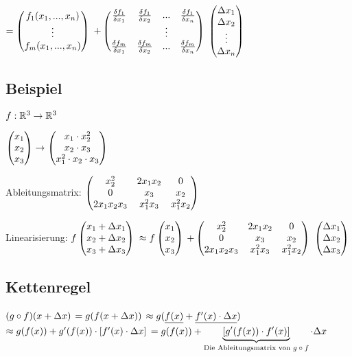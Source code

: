 $=  \begin{pmatrix} f_1(x_1,...,x_n)\\\vdots\\f_m(x_1,...,x_n) \end{pmatrix}  $
$+  \begin{pmatrix} \frac{\delta f_1}{\delta x_1} & \frac{\delta f_1}{\delta x_2} & ... & \frac{\delta f_1}{\delta x_n}\\ & & \vdots & \\\frac{\delta f_m}{\delta x_1} & \frac{\delta f_m}{\delta x_2} & ... & \frac{\delta f_m}{\delta x_n} \end{pmatrix} $
$ \begin{pmatrix} \Delta x_1\\\Delta x_2\\\vdots\\\Delta x_n \end{pmatrix} $ 

\subsection{Beispiel}
$f : \mathbb{R}^3 \rightarrow \mathbb{R}^3$

$ \begin{pmatrix} x_1\\x_2\\x_3 \end{pmatrix}  \rightarrow  \begin{pmatrix} x_1 \cdot x_2^2\\ x_2 \cdot x_3 \\ x_1^2 \cdot x_2 \cdot x_3 \end{pmatrix} $

Ableitungsmatrix: 
$ \begin{pmatrix} x_2^2 & 2x_1 x_2 & 0\\ 0 & x_3 & x_2\\2 x_1 x_2 x_3 & x_1^2 x_3 & x_1^2 x_2 \end{pmatrix} $

Linearisierung: 
$f  \begin{pmatrix} x_1 + \Delta x_1\\ x_2 + \Delta x_2\\ x_3 + \Delta x_3 \end{pmatrix} $
$\approx f \begin{pmatrix} x_1\\ x_2 \\ x_3	 \end{pmatrix} $
$+ \begin{pmatrix} x_2^2 & 2x_1 x_2 & 0\\ 0 & x_3 & x_2\\2 x_1 x_2 x_3 & x_1^2 x_3 & x_1^2 x_2 \end{pmatrix} $
$ \begin{pmatrix} \Delta x_1\\ \Delta x_2\\ \Delta x_3 \end{pmatrix} $

\subsection{Kettenregel}
$ (g\circ f) (x+\Delta x) $
$=g(f(x+\Delta x))$
$\approx g(\underline{f(x)} + \underline{f'(x) \cdot \Delta x})$
$\approx g(f(x)) + g'(f(x)) \cdot [f'(x) \cdot \Delta x]$
$= g(f(x)) + \underbrace{[g'(f(x)) \cdot f'(x)]}_{\textrm{Die Ableitungsmatrix von $g\circ f$}} \cdot \Delta x$

